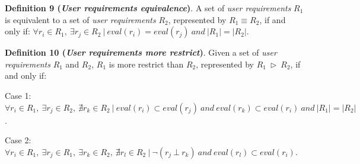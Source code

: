 \bigskip
\noindent \textbf{Definition 9 (\textsl{User requirements equivalence})}.
A set of \textsl{user requirements} $R_{1}$ is equivalent to a set of \textsl{user requirements} $R_{2}$, represented by $R_{1} \equiv R_{2}$, if and only if: $\forall r_{i} \in R_{1}, \ \exists r_{j} \in R_{2} \ \vert \ eval (r_{i}) = eval(r_{j}) \ and \ \vert R_{1} \vert = \vert R_{2} \vert$.

\bigskip
\noindent \textbf{Definition 10 (\textsl{User requirements more restrict})}.
Given a set of \textsl{user requirements} $R_{1}$ and $R_{2}$, $R_{1}$ is more restrict than $R_{2}$, represented by $R_{1} \ \rhd \ R_{2}$, if and only if:
\begin{flushleft}
Case 1: $\forall r_{i} \in R_{1}, \ \exists r_{j} \in R_{2}, \ \nexists r_{k} \in R_{2} \ \vert \ eval (r_{i}) \subset eval(r_{j}) \ and \ eval (r_{k}) \subset eval(r_{i}) \ and \ \vert R_{1} \vert = \vert R_{2} \vert$.
\end{flushleft}
\begin{flushleft}
Case 2: $\forall r_{i} \in R_{1}, \ \exists r_{j} \in R_{1}, \ \exists r_{k} \in R_{2}, \ \nexists r_{l} \in R_{2} \ \vert \ \neg (r_{j} \ \bot \ r_{k}) \ and \ eval (r_{l}) \subset eval(r_{i})$.
\end{flushleft}


